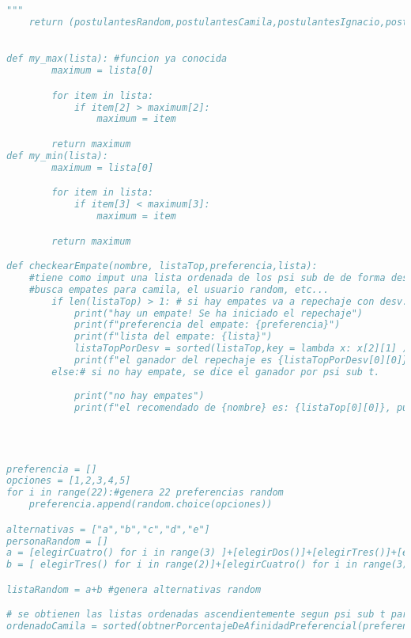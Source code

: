 \documentclass[a4paper]{article}
\begin{document}
\begin{lstlisting}[language=Python]
    """
    return (postulantesRandom,postulantesCamila,postulantesIgnacio,postulantesJuana)

    
def my_max(lista): #funcion ya conocida
        maximum = lista[0]

        for item in lista:
            if item[2] > maximum[2]:
                maximum = item

        return maximum    
def my_min(lista):
        maximum = lista[0]

        for item in lista:
            if item[3] < maximum[3]:
                maximum = item

        return maximum 

def checkearEmpate(nombre, listaTop,preferencia,lista): 
    #tiene como imput una lista ordenada de los psi sub de de forma descendiente
    #busca empates para camila, el usuario random, etc...
        if len(listaTop) > 1: # si hay empates va a repechaje con desv. est.
            print("hay un empate! Se ha iniciado el repechaje")
            print(f"preferencia del empate: {preferencia}")
            print(f"lista del empate: {lista}")
            listaTopPorDesv = sorted(listaTop,key = lambda x: x[2][1] )
            print(f"el ganador del repechaje es {listaTopPorDesv[0][0]}")
        else:# si no hay empate, se dice el ganador por psi sub t.
            
            print("no hay empates")
            print(f"el recomendado de {nombre} es: {listaTop[0][0]}, pues tiene un porcentaje de {listaTop[0][2][0]}")   
              
    


preferencia = []
opciones = [1,2,3,4,5]
for i in range(22):#genera 22 preferencias random
    preferencia.append(random.choice(opciones))

alternativas = ["a","b","c","d","e"]
personaRandom = []
a = [elegirCuatro() for i in range(3) ]+[elegirDos()]+[elegirTres()]+[elegirCuatro()]+[elegirCinco()]+[elegirCuatro()]+[elegirDos() for i in range(2)]+[elegirCuatro() for i in range(3)]
b = [ elegirTres() for i in range(2)]+[elegirCuatro() for i in range(3)]+[elegirCinco()]+[ elegirTres() for i in range(2)]+[elegirCuatro()]

listaRandom = a+b #genera alternativas random

# se obtienen las listas ordenadas ascendientemente segun psi sub t para cada usuario
ordenadoCamila = sorted(obtnerPorcentajeDeAfinidadPreferencial(preferencia,listaRandom)[1], key = lambda x: x[2][0], reverse=True)


\end{lstlisting}
\end{document}
